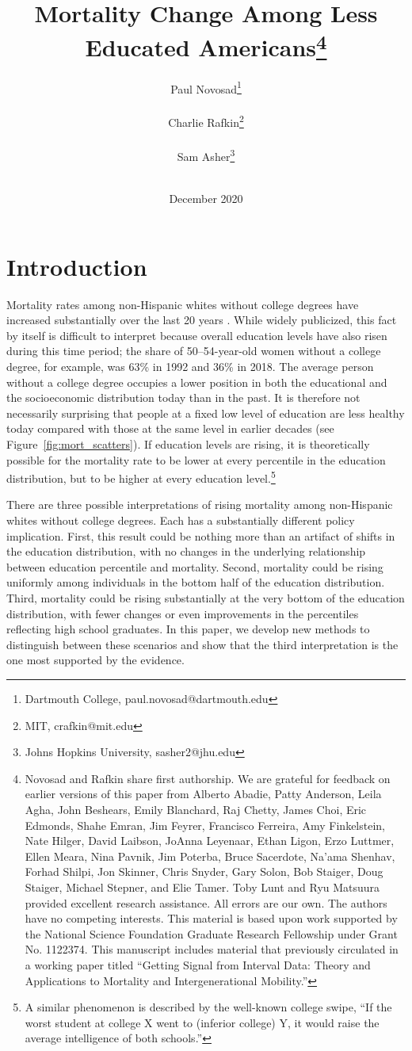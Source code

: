 \documentclass[12pt,letterpaper]{article}
\title{Mortality Change Among Less Educated Americans\footnote{Novosad and Rafkin share first authorship. We are grateful for feedback on earlier versions of
    this paper from Alberto Abadie, Patty
    Anderson, Leila Agha, John Beshears, Emily Blanchard, Raj Chetty,
    James Choi, Eric Edmonds, Shahe Emran, Jim Feyrer, Francisco
    Ferreira, Amy
    Finkelstein, Nate Hilger, David Laibson, JoAnna Leyenaar, Ethan
    Ligon, Erzo Luttmer, Ellen Meara, Nina Pavnik, Jim Poterba, Bruce
    Sacerdote, Na'ama Shenhav, Forhad Shilpi, Jon Skinner, Chris
    Snyder, Gary Solon, Bob Staiger, Doug
    Staiger, Michael Stepner, and Elie Tamer. Toby Lunt and Ryu
    Matsuura provided excellent research assistance. All errors are our own. The authors have no competing interests. This
    material is based upon work supported by the National Science
    Foundation Graduate Research Fellowship under Grant No. 1122374. This
    manuscript includes material that previously circulated in a
    working paper titled ``Getting Signal from Interval
    Data: Theory and Applications to Mortality and Intergenerational
    Mobility.''}}
\author{Paul Novosad\thanks{Dartmouth College,
    paul.novosad@dartmouth.edu} \\ \\ Charlie Rafkin\thanks{MIT,
    crafkin@mit.edu} \\ \\ Sam Asher\thanks{Johns Hopkins
    University, sasher2@jhu.edu} \\ \\ }
\numberwithin{equation}{section}
\begin{document}
\date{December 2020}

\maketitle\thispagestyle{empty}


\begin{abstract}



\end{abstract}

\newpage
\clearpage
\setcounter{page}{1}
 \doublespacing

\section{Introduction}
\label{sec:intro}

Mortality rates among non-Hispanic whites without college degrees have
increased substantially over the last 20 years
\citep{Meara2008,Cutler2010,Cutler2011,Olshansky2012,Case2015,Case2017}.
While widely publicized, this fact by itself is difficult to interpret
because overall education levels have also risen during this time
period; the share of 50--54-year-old women without a college degree,
for example, was 63\% in 1992 and 36\% in 2018. The average person
without a college degree occupies a lower position in both the
educational and the socioeconomic distribution today than in the
past. It is therefore not necessarily surprising that people at a
fixed low level of education are less healthy today compared with
those at the same level in earlier decades (see
Figure~\ref{fig:mort_scatters}). If education levels are rising, it is
theoretically possible for the mortality rate to be lower at
every percentile in the education distribution, but to be higher at
every education level.\footnote{A similar phenomenon is described by
  the well-known college swipe, ``If the worst student at college X went to (inferior college) Y, it would raise the average intelligence of both schools.''}

There are three possible interpretations of rising mortality among non-Hispanic whites without college degrees. Each has a substantially different policy implication. First, this result could be nothing more than an artifact of shifts in the education distribution, with no changes in the underlying relationship between education percentile and mortality. Second, mortality could be rising uniformly among individuals in the bottom half of the education distribution. Third, mortality could be rising substantially at the very bottom of the education distribution, with fewer changes or even improvements in the percentiles reflecting high school graduates. In this paper, we develop new methods to distinguish between these scenarios and show that the third interpretation is the one most supported by the evidence.
\end{document}
